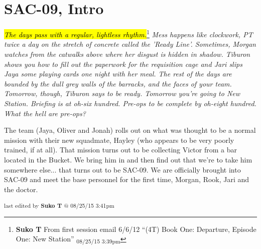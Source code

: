 \setcounter{chapter}{ 0 }
\chapter{\textbf{SAC-09, Intro} }




\textit{\hl{The days pass with a regular, lightless rhythm.}}\footnote{\textbf{Suko T }From first session email 6/6/12
``(4T) Book One: Departure, Episode One: New Station'' \textsubscript{08/25/15 3:39pm}}\textit{ Mess happens like clockwork, PT twice a day on the stretch of concrete called the 'Ready Line'. Sometimes, Morgan watches from the catwalks above where her disgust is hidden in shadow. Tiburon shows you how to fill out the paperwork for the requisition cage and Jari slips Jaya some playing cards one night with her meal. The rest of the days are bounded by the dull grey walls of the barracks, and the faces of your team. Tomorrow, though, Tiburon says to be ready. Tomorrow you're going to New Station. Briefing is at oh-six hundred. Pre-ops to be complete by oh-eight hundred. What the hell are pre-ops?}

The team (Jaya, Oliver and Jonah) rolls out on what was thought to be a normal mission with their new squadmate, Hayley (who appears to be very poorly trained, if at all). That mission turns out to be collecting Victor from a bar located in the Bucket. We bring him in and then find out that we're to take him somewhere else... that turns out to be SAC-09.  We are officially brought into SAC-09 and meet the base personnel for the first time, Morgan, Rook, Jari and the doctor.

 \vspace{\fill}

\begin{flushright}
\textsubscript{last edited by \textbf{Suko T} @ 08/25/15 3:41pm}
\end{flushright}
